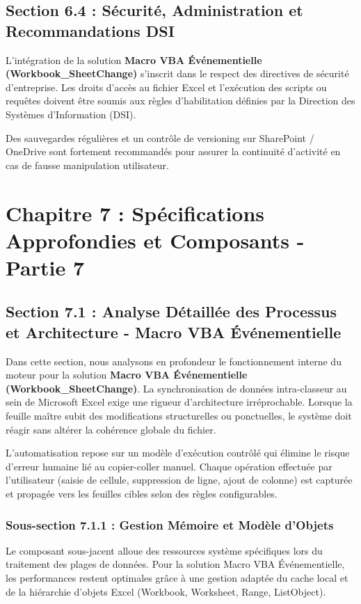 \documentclass[12pt,a4paper]{report}
\begin{document}
\section{Section 6.4 : Sécurité, Administration et Recommandations DSI}
L'intégration de la solution \textbf{Macro VBA Événementielle (Workbook\_SheetChange)} s'inscrit dans le respect des directives de sécurité d'entreprise. Les droits d'accès au fichier Excel et l'exécution des scripts ou requêtes doivent être soumis aux règles d'habilitation définies par la Direction des Systèmes d'Information (DSI).

Des sauvegardes régulières et un contrôle de versioning sur SharePoint / OneDrive sont fortement recommandés pour assurer la continuité d'activité en cas de fausse manipulation utilisateur.


\chapter{Chapitre 7 : Spécifications Approfondies et Composants - Partie 7}

\section{Section 7.1 : Analyse Détaillée des Processus et Architecture - Macro VBA Événementielle}
Dans cette section, nous analysons en profondeur le fonctionnement interne du moteur pour la solution \textbf{Macro VBA Événementielle (Workbook\_SheetChange)}. La synchronisation de données intra-classeur au sein de Microsoft Excel exige une rigueur d'architecture irréprochable. Lorsque la feuille maître subit des modifications structurelles ou ponctuelles, le système doit réagir sans altérer la cohérence globale du fichier.

L'automatisation repose sur un modèle d'exécution contrôlé qui élimine le risque d'erreur humaine lié au copier-coller manuel. Chaque opération effectuée par l'utilisateur (saisie de cellule, suppression de ligne, ajout de colonne) est capturée et propagée vers les feuilles cibles selon des règles configurables.


\subsection{Sous-section 7.1.1 : Gestion Mémoire et Modèle d'Objets}
Le composant sous-jacent alloue des ressources système spécifiques lors du traitement des plages de données. Pour la solution Macro VBA Événementielle, les performances restent optimales grâce à une gestion adaptée du cache local et de la hiérarchie d'objets Excel (Workbook, Worksheet, Range, ListObject).
\end{document}
